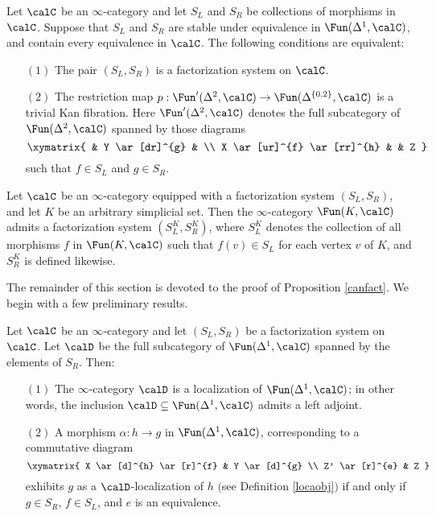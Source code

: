 \begin{proposition}\label{canfact}
Let $\calC$ be an $\infty$-category and let $S_L$ and $S_R$ be collections of morphisms
in $\calC$. Suppose that $S_L$ and $S_R$ are stable under equivalence in $\Fun( \Delta^1, \calC)$, and contain every equivalence in $\calC$.
The following conditions are equivalent:
\begin{itemize}
\item[$(1)$] The pair $(S_L, S_R)$ is a factorization system on $\calC$.
\item[$(2)$] The restriction map $p: \Fun'( \Delta^2, \calC) \rightarrow \Fun( \Delta^{ \{0,2\} }, \calC)$
is a trivial Kan fibration. Here $\Fun'( \Delta^2, \calC)$ denotes the full subcategory of
$\Fun( \Delta^2, \calC)$ spanned by those diagrams
$$ \xymatrix{ & Y \ar[dr]^{g} & \\
X \ar[ur]^{f} \ar[rr]^{h} & & Z }$$
such that $f \in S_L$ and $g \in S_R$. 
\end{itemize}
\end{proposition}

\begin{corollary}\label{funcsys}
Let $\calC$ be an $\infty$-category equipped with a factorization system $(S_L, S_R)$, and let $K$ be an arbitrary simplicial set. Then the $\infty$-category $\Fun(K, \calC)$ admits a factorization system
$(S_L^{K}, S_R^{K})$, where $S_{L}^{K}$ denotes the collection of all morphisms $f$ in 
$\Fun(K, \calC)$ such that $f(v) \in S_L$ for each vertex $v$ of $K$, and
$S_{R}^{K}$ is defined likewise.
\end{corollary}

The remainder of this section is devoted to the proof of Proposition \ref{canfact}. We begin with a few preliminary results.

\begin{lemma}\label{prefukt}
Let $\calC$ be an $\infty$-category and let $(S_L, S_R)$ be a factorization system on $\calC$.
Let $\calD$ be the full subcategory of $\Fun( \Delta^1, \calC)$ spanned by the elements of $S_R$.
Then:
\begin{itemize}
\item[$(1)$] The $\infty$-category $\calD$ is a localization of $\Fun( \Delta^1, \calC)$; in other words, the inclusion $\calD \subseteq \Fun( \Delta^1, \calC)$ admits a left adjoint.

\item[$(2)$] A morphism $\alpha: h \rightarrow g$ in $\Fun( \Delta^1, \calC)$, corresponding to a commutative diagram
$$ \xymatrix{ X \ar[d]^{h} \ar[r]^{f} & Y \ar[d]^{g} \\
Z' \ar[r]^{e} & Z }$$
exhibits $g$ as a $\calD$-localization of $h$ $($see Definition \ref{locaobj}$)$ if and only if $g \in S_R$, $f \in S_L$, and 
$e$ is an equivalence.
\end{itemize}
\end{lemma}

